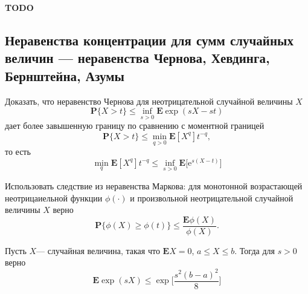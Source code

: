 \textbf{
TODO
}



\subsection{Неравенства концентрации для сумм случайных величин ---  неравенства Чернова, Хевдинга, Бернштейна, Азумы}


\begin{problem}

Доказать, что неравенство Чернова для неотрицательной случайной величины $X$
\begin{equation*}
\mathbf{P}\{ X >t\}\leq \inf_{s>0}\mathbf{E}\exp(sX-st)
\end{equation*}
 дает более завышенную границу по сравнению с моментной границей
\begin{equation*}
\mathbf{P}\{ X >t\}\leq \min_{q>0}\mathbf{E}[X^q]t^{-q},
\end{equation*}
 то есть 
\begin{equation*}
\min_q\mathbf{E}[X^q]t^{-q}\leq \inf_{s>0}\mathbf{E}\big[\text{e}^{s(X-t)}\bigl]
\end{equation*}
\end{problem}

\begin{remark} Использовать следствие из неравенства Маркова: для монотонной возрастающей неотрицаиельной функции $\phi(\cdot)$ и произвольной неотрицательной случайной величины $X$ верно
\begin{equation*}
\mathbf{P}\{\phi(X)\geq \phi(t)\}\leq \frac{\mathbf{E}\phi(X)}{\phi(X)}.
\end{equation*}
\end{remark}



\begin{problem} Пусть $X$--- случайная величина, такая что $\mathbf{E}X =0$, $a\leq X\leq b$. Тогда для $s>0$ верно
\begin{equation*}
\mathbf{E}\exp(s X)\leq \exp\bigg[\frac{s^2(b-a)^2}{8}\biggr]
\end{equation*}
\end{problem}

